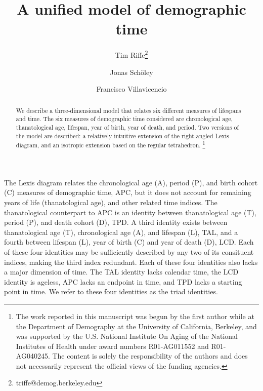 \documentclass[11pt,oneside,a4paper]{article} %
\newcommand\ackn[1]{%
  \begingroup
  \renewcommand\thefootnote{}\footnote{#1}%
  \addtocounter{footnote}{-1}%
  \endgroup
}
\begin{document}
\title{A unified model of demographic time}

\author[1]{Tim Riffe\thanks{triffe@demog.berkeley.edu}}
\author[2,3]{Jonas Sch{\"o}ley}
\author[2,3]{Francisco Villavicencio}


\maketitle

\begin{abstract}
We describe a three-dimensional model that relates six different measures of
lifespans and time. The six measures of demographic time considered are
chronological age, thanatological age, lifespan, year of birth, year of death,
and period. Two versions of the model are described: a relatively intuitive
extension of the right-angled Lexis diagram, and an isotropic extension based on
the regular tetrahedron. \ackn{The work reported in this manuscript was begun by
the first author while at the Department of Demography at the University of
California, Berkeley, and was supported by the U.S.
National Institute On Aging of the National Institutes of Health under award
numbers R01-AG011552 and R01-AG040245. The content is solely the responsibility of the authors and does not necessarily represent the official views of the funding agencies.}
\end{abstract}
The Lexis diagram relates the chronological age (A), period (P),
and birth cohort (C) measures of demographic time, APC, but it does not account
for remaining years of life (thanatological age), and other related time
indices.
The thanatological counterpart to APC is an identity between thanatological
age (T), period (P), and death cohort (D), TPD. A third
identity exists between thanatological age (T), chronological age (A), and
lifespan (L), TAL, and a fourth between lifespan (L), year of birth (C) and year
of death (D), LCD.
Each of these four identities may be sufficiently described by any
two of its consituent indices, making the third index redundant. Each of these
four identities also lacks a major dimension of time. The TAL identity
lacks calendar time, the LCD identity is ageless, APC lacks an endpoint in time,
and TPD lacks a starting point in time. We refer to these four identities
as the triad identities.
\end{document}

